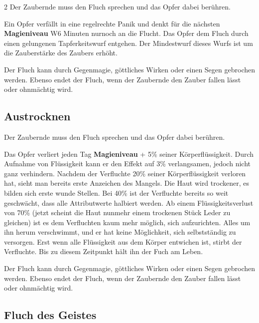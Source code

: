 \begin{multicols*}{2}
Der Zaubernde muss den Fluch sprechen und das Opfer dabei berühren.

Ein Opfer verfällt in eine regelrechte Panik und denkt für die nächsten \textbf{Magieniveau} W6 Minuten nurnoch an die Flucht.  Das Opfer dem Fluch durch einen gelungenen Tapferkeitswurf entgehen. Der Mindestwurf dieses Wurfs ist um die Zauberstärke des Zaubers erhöht.

Der Fluch kann durch Gegenmagie, göttliches Wirken oder einen Segen gebrochen werden. Ebenso endet der Fluch, wenn der Zaubernde den Zauber fallen lässt oder ohnmächtig wird.



\subsection{Austrocknen}

Der Zaubernde muss den Fluch sprechen und das Opfer dabei berühren.

Das Opfer verliert jeden Tag \textbf{Magieniveau} + 5\% seiner Körperflüssigkeit. Durch Aufnahme von Flüssigkeit kann er den Effekt auf 3\% verlangsamen, jedoch nicht ganz verhindern. Nachdem der Verfluchte 20\% seiner Körperflüssigkeit verloren hat, sieht man bereits erste Anzeichen des Mangels. Die Haut wird trockener, es bilden sich erste wunde Stellen. Bei 40\% ist der Verfluchte bereits so weit geschwächt, dass alle Attributwerte halbiert werden. Ab einem Flüssigkeitsverlust von 70\% (jetzt scheint die Haut nunmehr einem trockenen Stück Leder zu gleichen) ist es dem Verfluchten kaum mehr möglich, sich aufzurichten. Alles um ihn herum verschwimmt, und er hat keine Möglichkeit, sich selbstständig zu versorgen. Erst wenn alle Flüssigkeit aus dem Körper entwichen ist, stirbt der Verfluchte. Bis zu diesem Zeitpunkt hält ihn der Fuch am Leben.

Der Fluch kann durch Gegenmagie, göttliches Wirken oder einen Segen gebrochen werden. Ebenso endet der Fluch, wenn der Zaubernde den Zauber fallen lässt oder ohnmächtig wird.



\subsection{Fluch des Geistes}


\end{multicols*}
